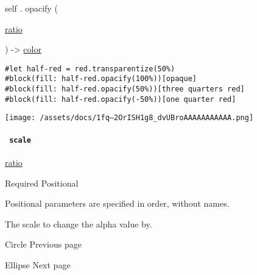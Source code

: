 self { . } { opacify } (

{ \href{/docs/reference/layout/ratio/}{ratio} }

) -\textgreater{} \href{/docs/reference/visualize/color/}{color}

\begin{verbatim}
#let half-red = red.transparentize(50%)
#block(fill: half-red.opacify(100%))[opaque]
#block(fill: half-red.opacify(50%))[three quarters red]
#block(fill: half-red.opacify(-50%))[one quarter red]
\end{verbatim}

\texttt{[image: /assets/docs/1fq--2OrISH1g8\_dvUBroAAAAAAAAAAA.png]}

\paragraph{\texorpdfstring{\texttt{\ scale\ }}{ scale }}\label{definitions-opacify-scale}

\href{/docs/reference/layout/ratio/}{ratio}

{Required} {{ Positional }}

\label{definitions-opacify-scale-positional-tooltip}
Positional parameters are specified in order, without names.

The scale to change the alpha value by.

\href{/docs/reference/visualize/circle/}{\pandocbounded{}}

{ Circle } { Previous page }

\href{/docs/reference/visualize/ellipse/}{\pandocbounded{}}

{ Ellipse } { Next page }
